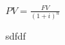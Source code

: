\documentclass[a4paper,12pt]{article}
\begin{document}
$PV = \frac{FV}{(1+\textit{i})^n}$

sdfdf
\end{document}
